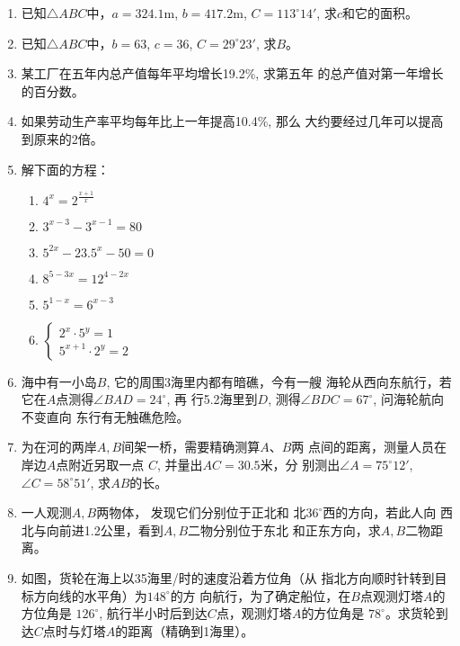 \begin{enumerate}
\item 已知$\triangle ABC$中，$a=324.1$m, $b=417.2$m, $C=113^{\circ}14'$,
求$c$和它的面积。
\item 已知$\triangle ABC$中，$b=63$, $c=36$, $C=29^{\circ}23'$, 求$B$。
\item 某工厂在五年内总产值每年平均增长19.2\%, 求第五年
的总产值对第一年增长的百分数。
\item 如果劳动生产率平均每年比上一年提高10.4\%, 那么
大约要经过几年可以提高到原来的2倍。
\item 解下面的方程：
\begin{multicols}{2}
\begin{enumerate}
    \item $4^{x}=2^{\tfrac{x+1}{x}}$
    \item $3^{x-3}-3^{x-1}=80$
    \item $5^{2x}-23.5^x-50=0$
    \item $8^{5-3x}=12^{4-2x}$
    \item $5^{1-x}=6^{x-3}$
    \item $\begin{cases}
        2^x\cdot 5^y=1\\
        5^{x+1}\cdot 2^y=2
    \end{cases}$
\end{enumerate}
\end{multicols}

\item 海中有一小岛$B$, 它的周围3海里内都有暗礁，今有一艘
海轮从西向东航行，若它在$A$点测得$\angle BAD=24^{\circ}$, 再
行5.2海里到$D$, 测得$\angle BDC=67^{\circ}$, 问海轮航向不变直向
东行有无触礁危险。
\item 为在河的两岸$A,B$间架一桥，需要精确测算$A$、$B$两
点间的距离，测量人员在
岸边$A$点附近另取一点
$C$, 并量出$AC=30.5$米，分
别测出$\angle A=75^{\circ}12'$, 
$\angle C=58^{\circ}51'$, 求$AB$的长。
\item 一人观测$A,B$两物体，
发现它们分别位于正北和
北$36^{\circ}$西的方向，若此人向
西北与向前进1.2公里，看到$A,B$二物分别位于东北
和正东方向，求$A,B$二物距离。
\item  如图，货轮在海上以35海里/时的速度沿着方位角（从
指北方向顺时针转到目标方向线的水平角）为$148^{\circ}$的方
向航行，为了确定船位，在$B$点观测灯塔$A$的方位角是
$126^{\circ}$, 航行半小时后到达$C$点，观测灯塔$A$的方位角是
$78^{\circ}$。求货轮到达$C$点时与灯塔$A$的距离（精确到1海里）。

\begin{figure}[htp]\centering
    \begin{minipage}[t]{0.48\textwidth}
    \centering
{}
\end{minipage}
\end{figure}
\end{enumerate}
